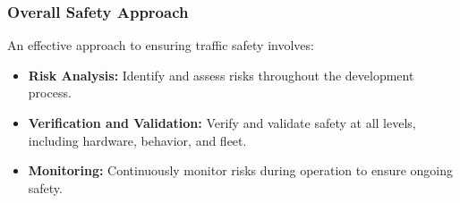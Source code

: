 \subsubsection*{Overall Safety Approach}
An effective approach to ensuring traffic safety involves:
\begin{itemize}
    \item \textbf{Risk Analysis:} Identify and assess risks throughout the development process.
    \item \textbf{Verification and Validation:} Verify and validate safety at all levels, including hardware, behavior, and fleet.
    \item \textbf{Monitoring:} Continuously monitor risks during operation to ensure ongoing safety.
\end{itemize}
